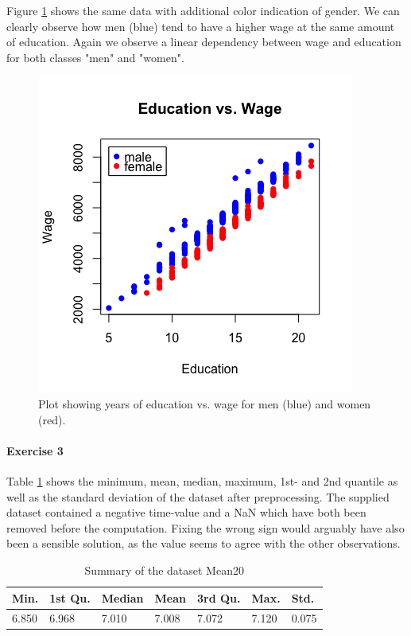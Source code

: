 \documentclass{paper}
\begin{document}
Figure \ref{fig:EduWageFM} shows the same data with additional color indication of gender. We can clearly observe how men (blue) tend to have a higher wage at the same amount of education. Again we observe a linear dependency between wage and education for both classes "men" and "women". 

\begin{figure}[h]
\begin{center}
\quad\quad   \includegraphics[width=.7\linewidth]{EduWageMF}
\end{center}
\caption{Plot showing years of education vs. wage for men (blue) and women (red).}
\label{fig:EduWageFM}
\end{figure}


\paragraph{Exercise 3}

Table \ref{tab:summary} shows the minimum, mean, median, maximum, 1st- and 2nd quantile as well as the standard deviation of the dataset after preprocessing.
The supplied dataset contained a negative time-value and  a NaN which have both been removed before the computation. Fixing the wrong sign would arguably have also been a sensible solution, as the value seems to agree with the other observations.

\begin{table}[h]
\centering
\caption{Summary of the dataset Mean20}
\label{tab:summary}
\begin{tabular}{|l|l|l|l|l|l|l|}
\hline
Min.  & 1st Qu. & Median & Mean  & 3rd Qu. & Max.  & Std.  \\ \hline 
6.850 & 6.968   & 7.010  & 7.008 & 7.072   & 7.120 & 0.075 \\ \hline
\end{tabular}
\end{table}
\end{document}
